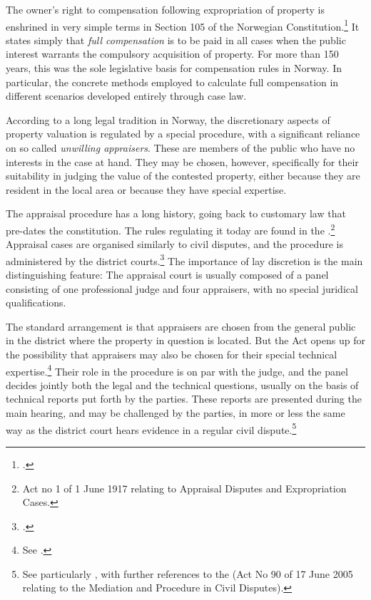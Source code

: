 The owner's right to compensation following expropriation of property is enshrined in very simple terms in Section 105 of the Norwegian Constitution.\footnote{\cite[105]{grunnloven14}.} It states simply that \emph{full compensation} is to be paid in all cases when the public interest warrants the compulsory acquisition of property. For more than 150 years, this was the sole legislative basis for compensation rules in Norway. In particular, the concrete methods employed to calculate full compensation in different scenarios developed entirely through case law.

According to a long legal tradition in Norway, the discretionary aspects of property valuation is regulated by a special procedure, with a significant reliance on so called \emph{unwilling appraisers}. These are members of the public who have no interests in the case at hand. They may be chosen, however,  specifically for their suitability in judging the value of the contested property, either because they are resident in the local area or because they have special expertise.

The appraisal procedure has a long history, going back to customary law that pre-dates the constitution. The rules regulating it today are found in the \cite{aa17}.\footnote{Act no 1 of 1 June 1917 relating to Appraisal Disputes and Expropriation Cases.} Appraisal cases are organised similarly to civil disputes, and the procedure is administered by the district courts.\footnote{\cite[5]{aa17}.} The importance of lay discretion is the main distinguishing feature: The appraisal court is usually composed of a panel consisting of one professional judge and four appraisers, with no special juridical qualifications. 

The standard arrangement is that appraisers are chosen from the general public in the district where the property in question is located. But the Act opens up for the possibility that appraisers may also be chosen for their special technical expertise.\footnote{See \cite[11|12]{aa17}.} Their role in the procedure is on par with the judge, and the panel decides jointly both the legal and the technical questions, usually on the basis of technical reports put forth by the parties. These reports are presented during the main hearing, and may be challenged by the parties, in more or less the same way as the district court hears evidence in a regular civil dispute.\footnote{See particularly \cite[22|27]{aa17}, with further references to the \cite{da05} (Act No 90 of 17 June 2005 relating to the Mediation and Procedure in Civil Disputes).}


